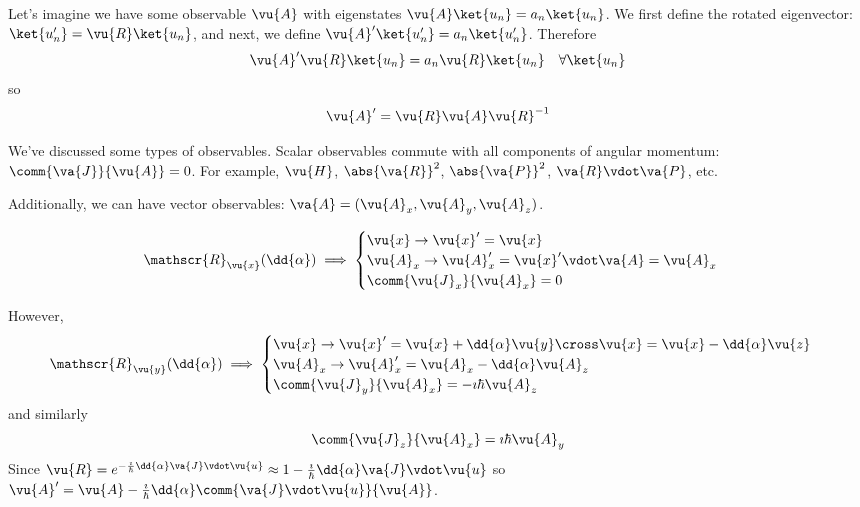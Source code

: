 \documentclass[a4paper,twoside,master.tex]{subfiles}
\begin{document}

Let's imagine we have some observable $ \vu{A} $ with eigenstates $ \vu{A}\ket{u_n} = a_n\ket{u_n} $. We first define the rotated eigenvector: $\ket{u'_n} = \vu{R}\ket{u_n} $, and next, we define $ \vu{A}'\ket{u'_n} = a_n\ket{u'_n} $. Therefore
\begin{equation}
    \vu{A}' \vu{R}\ket{u_n} = a_n \vu{R}\ket{u_n} \quad \forall\ket{u_n}
\end{equation}
so
\begin{equation}
    \vu{A}' = \vu{R} \vu{A} \vu{R}^{-1}
\end{equation}

We've discussed some types of observables. Scalar observables commute with all components of angular momentum: $ \comm{ \va{J}}{ \vu{A}} = 0 $. For example, $ \vu{H} $, $ \abs{ \va{R}}^2 $, $ \abs{ \va{P}}^2  $, $ \va{R} \vdot \va{P} $, etc.

Additionally, we can have vector observables: $ \va{A} = (\vu{A}_x, \vu{A}_y, \vu{A}_z) $.

\begin{equation}
    \mathscr{R}_{ \vu{x}}(\dd{\alpha})\implies\begin{cases} \vu{x} \to \vu{x}' = \vu{x} \\ \vu{A}_x \to \vu{A}'_x = \vu{x}' \vdot \va{A} = \vu{A}_x \\ \comm{ \vu{J}_x}{ \vu{A}_x} = 0\end{cases}
\end{equation}

However,
\begin{equation}
    \mathscr{R}_{ \vu{y}}(\dd{\alpha}) \implies \begin{cases} \vu{x} \to \vu{x}' = \vu{x} + \dd{\alpha} \vu{y} \cross \vu{x} = \vu{x} - \dd{\alpha} \vu{z} \\ \vu{A}_x \to \vu{A}'_x = \vu{A}_x - \dd{\alpha} \vu{A}_z \\ \comm{ \vu{J}_y}{ \vu{A}_x} = - \imath \hbar \vu{A}_z \end{cases}
\end{equation}
and similarly
\begin{equation}
    \comm{ \vu{J}_z}{ \vu{A}_x} = \imath \hbar \vu{A}_y
\end{equation}
Since $ \vu{R} = e^{- \frac{\imath}{\hbar} \dd{\alpha} \va{J} \vdot \vu{u}} \approx 1- \frac{\imath}{\hbar} \dd{\alpha} \va{J} \vdot \vu{u} $ so $ \vu{A}' = \vu{A} - \frac{\imath}{\hbar} \dd{\alpha} \comm{ \va{J} \vdot \vu{u}}{ \vu{A}} $.
\end{document}
